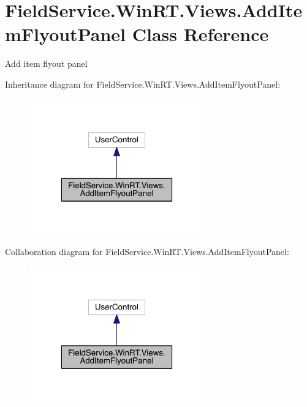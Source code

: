 \hypertarget{class_field_service_1_1_win_r_t_1_1_views_1_1_add_item_flyout_panel}{\section{Field\+Service.\+Win\+R\+T.\+Views.\+Add\+Item\+Flyout\+Panel Class Reference}
\label{class_field_service_1_1_win_r_t_1_1_views_1_1_add_item_flyout_panel}
}


Add item flyout panel  




Inheritance diagram for Field\+Service.\+Win\+R\+T.\+Views.\+Add\+Item\+Flyout\+Panel\+:
\nopagebreak
\begin{figure}[H]
\begin{center}
\leavevmode
\includegraphics[width=214pt]{class_field_service_1_1_win_r_t_1_1_views_1_1_add_item_flyout_panel__inherit__graph}
\end{center}
\end{figure}


Collaboration diagram for Field\+Service.\+Win\+R\+T.\+Views.\+Add\+Item\+Flyout\+Panel\+:
\nopagebreak
\begin{figure}[H]
\begin{center}
\leavevmode
\includegraphics[width=214pt]{class_field_service_1_1_win_r_t_1_1_views_1_1_add_item_flyout_panel__coll__graph}
\end{center}
\end{figure}
